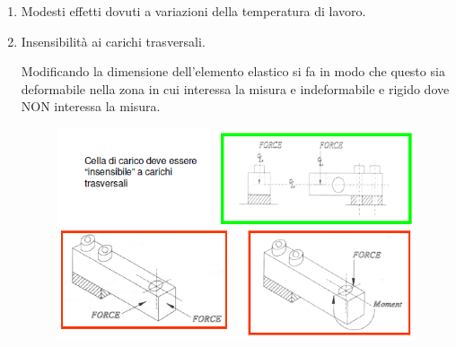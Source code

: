 \documentclass[a4paper, 15pt]{article}
\begin{document}
\begin{adjustwidth}{2in}{}
\begin{enumerate}
		 	\item Modesti effetti dovuti a variazioni della temperatura di lavoro.
		 	
		 	\item Insensibilità ai carichi trasversali.
		 	
		 	Modificando la dimensione dell'elemento elastico si fa in modo che questo sia deformabile nella zona in cui interessa la misura e indeformabile e rigido dove NON interessa la misura.
		 	\begin{figure}[H]
		 		\centering
		 		\includegraphics[width=0.5\linewidth]{immagini/screenshot003}
		 		\label{fig:screenshot003}
		 	\end{figure}		 	
		 \end{enumerate}
\end{adjustwidth}
\end{document}
